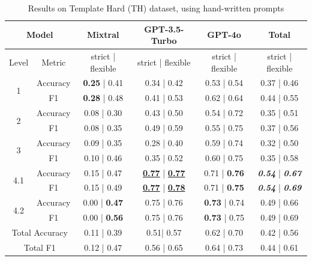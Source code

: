 \documentclass[runningheads]{llncs}
\begin{document}
\begin{table}[!tb]
\centering
\caption{Results on Template Hard (TH) dataset, using hand-written prompts}
\begin{tabular}{cc|c|c|c|c}
\hline \hline
\multicolumn{2}{c|}{Model}  				& Mixtral& GPT-3.5-Turbo & GPT-4o & Total \\
\hline
Level & Metric                      & strict | flexible  & strict | flexible  & strict | flexible & strict | flexible       \\
\hline \hline
\multirow{2}{*}{1}     & Accuracy &	\textbf{0.25} | 0.41	& 0.34 | 0.42	& 0.53 | 0.54 & 0.37 | 0.46\\
      & F1	     &  \textbf{0.28} | 0.48	& 0.41 | 0.53   &	0.62 | 0.64 & 0.44 | 0.55 \\
			\hline
\multirow{2}{*}{2}			& Accuracy &	0.08 | 0.30	& 0.43 | 0.50 &	0.54 | 0.72 & 0.35 | 0.51 \\
		  & F1	     &  0.08 | 0.35 &	0.49 | 0.59 &	0.55 | 0.75 & 0.37 | 0.56\\
			\hline
\multirow{2}{*}{3}			& Accuracy & 0.09 | 0.35 &	0.28 | 0.40	& 0.59 | 0.74 & 0.32 | 0.50 \\
		  & F1	     &  0.10 | 0.46	& 0.35 | 0.52 &	0.60 | 0.75 & 0.35 | 0.58\\
			\hline
\multirow{2}{*}{4.1}   & Accuracy & 0.15 | 0.47 &	\underline{\textbf{0.77}} | \underline{\textbf{0.77}} &	0.71 | \textbf{0.76} & \textit{\textbf{0.54}} | \textit{\textbf{0.67}} \\
		& F1       &	0.15 | 0.49	& \underline{\textbf{0.77}} | \underline{\textbf{0.78}}	& 0.71 | \textbf{0.75} & \textit{\textbf{0.54}} | \textit{\textbf{0.69}} \\
			\hline
\multirow{2}{*}{4.2}   & Accuracy &	0.00 | \textbf{0.47}	& 0.75 | 0.76	& \textbf{0.73} | 0.74 & 0.49 | 0.66 \\
											 & F1       &	0.00 | \textbf{0.56}	& 0.75 | 0.76	& \textbf{0.73} | 0.75 & 0.49 | 0.69 \\
\hline \hline
\multicolumn{2}{c|}{Total Accuracy}	& 0.11 | 0.39	& 0.51| 0.57 &	0.62 | 0.70 & 0.42 | 0.56 \\
\multicolumn{2}{c|}{Total F1}  	      & 0.12 | 0.47	& 0.56 | 0.65	& 0.64 | 0.73 & 0.44 | 0.61 \\
 \hline \hline
\end{tabular}
\label{tbl:TH-handwritten}
\end{table}
\end{document}
